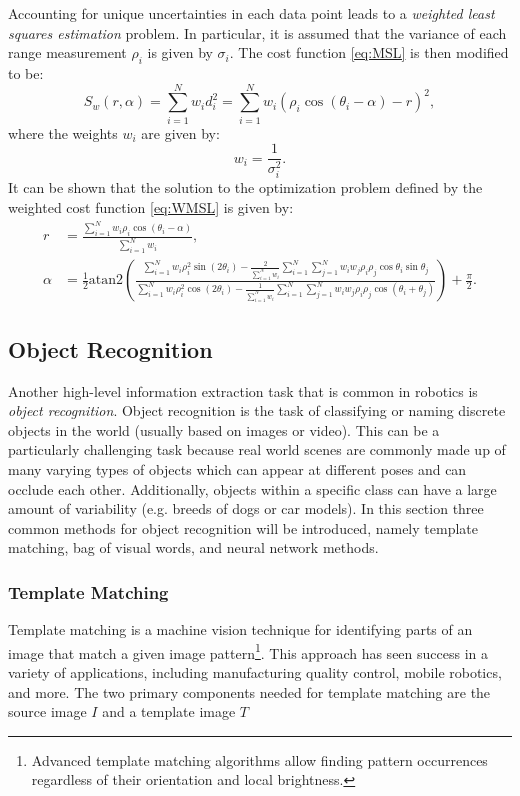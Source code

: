 Accounting for unique uncertainties in each data point leads to a \textit{weighted least squares estimation} problem. In particular, it is assumed that the variance of each range measurement $\rho_i$ is given by $\sigma_i$. The cost function \eqref{eq:MSL} is then modified to be: 
\begin{equation} \label{eq:WMSL}
    S_w(r,\alpha) = \sum_{i=1}^N w_i d_i^2 = \sum_{i=1}^N w_i (\rho_i \cos (\theta_i -\alpha) -r)^2,
\end{equation}
where the weights $w_i$ are given by:
\begin{equation*}
    w_i = \frac{1}{\sigma^2_i}.
\end{equation*}
It can be shown that the solution to the optimization problem defined by the weighted cost function \eqref{eq:WMSL} is given by:
\begin{equation}
\begin{split}
r &= \frac{\sum_{i=1}^N w_i\rho_i\cos(\theta_i - \alpha)}{\sum_{i=1}^N w_i}, \\
\alpha &= \frac{1}{2} \text{atan2} \left(\frac{\sum_{i=1}^N w_i\rho_i^2\sin(2\theta_i) - \frac{2}{\sum_{i=1}^N w_i}\sum_{i=1}^N\sum_{j=1}^N w_i w_j \rho_i \rho_j \cos\theta_i \sin \theta_j}{\sum_{i=1}^N w_i \rho_i^2\cos(2\theta_i) - \frac{1}{\sum_{i=1}^N w_i}\sum_{i=1}^N\sum_{j=1}^N w_i w_j \rho_i \rho_j \cos(\theta_i + \theta_j)}\right) + \frac{\pi}{2}.
\end{split}
\end{equation}

\subsection{Object Recognition}
Another high-level information extraction task that is common in robotics is \textit{object recognition}. Object recognition is the task of classifying or naming discrete objects in the world (usually based on images or video). This can be a particularly challenging task because real world scenes are commonly made up of many varying types of objects which can appear at different poses and can occlude each other. Additionally, objects within a specific class can have a large amount of variability (e.g. breeds of dogs or car models). In this section three common methods for object recognition will be introduced, namely template matching, bag of visual words, and neural network methods.

\subsubsection{Template Matching}
Template matching\cite{PerveenKumarEtAl2013} is a machine vision technique for identifying parts of an image that match a given image pattern\footnote{Advanced template matching algorithms allow finding pattern occurrences regardless of their orientation and local brightness.}. This approach has seen success in a variety of applications, including manufacturing quality control, mobile robotics, and more. The two primary components needed for template matching are the source image $I$ and a template image $T$

